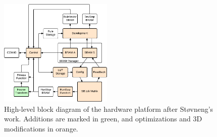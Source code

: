 \begin{figure}[!ht]
    \centering
    \includegraphics[width=0.48\textwidth]{figures/overview-stovneng}
    \caption{High-level block diagram of the hardware platform after Støvneng's work. Additions are marked in green, and optimizations and 3D modifications in orange.}
    \label{fig:overview-stovneng}
\end{figure}



